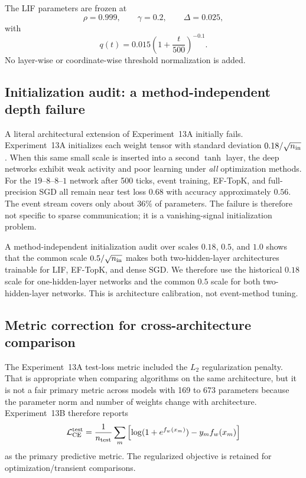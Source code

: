 The LIF parameters are frozen at
\begin{equation}
 \rho=0.999,\qquad \gamma=0.2,\qquad \Delta=0.025,
\end{equation}
with
\begin{equation}
 q(t)=0.015\left(1+\frac{t}{500}\right)^{-0.1}.
\end{equation}
No layer-wise or coordinate-wise threshold normalization is added.

\subsection{Initialization audit: a method-independent depth failure}

A literal architectural extension of Experiment~13A initially fails. Experiment~13A initializes each weight tensor with standard deviation $0.18/\sqrt{n_{\rm in}}$. When this same small scale is inserted into a second $\tanh$ layer, the deep networks exhibit weak activity and poor learning under \emph{all} optimization methods. For the $19$--$8$--$8$--$1$ network after 500 ticks, event training, EF-TopK, and full-precision SGD all remain near test loss $0.68$ with accuracy approximately $0.56$. The event stream covers only about $36\%$ of parameters. The failure is therefore not specific to sparse communication; it is a vanishing-signal initialization problem.

A method-independent initialization audit over scales $0.18$, $0.5$, and $1.0$ shows that the common scale $0.5/\sqrt{n_{\rm in}}$ makes both two-hidden-layer architectures trainable for LIF, EF-TopK, and dense SGD. We therefore use the historical $0.18$ scale for one-hidden-layer networks and the common $0.5$ scale for both two-hidden-layer networks. This is architecture calibration, not event-method tuning.

\subsection{Metric correction for cross-architecture comparison}

The Experiment~13A test-loss metric included the $L_2$ regularization penalty. That is appropriate when comparing algorithms on the same architecture, but it is not a fair primary metric across models with 169 to 673 parameters because the parameter norm and number of weights change with architecture. Experiment~13B therefore reports
\begin{equation}
 \mathcal L_{\rm CE}^{\rm test}
 =\frac{1}{n_{\rm test}}\sum_m
 \left[\log(1+e^{f_w(x_m)})-y_m f_w(x_m)\right]
\end{equation}
as the primary predictive metric. The regularized objective is retained for optimization/transient comparisons.

